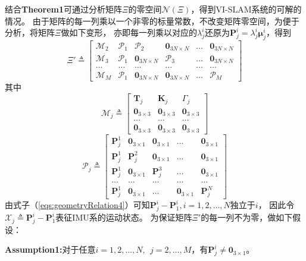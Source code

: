 \documentclass{article}
\begin{document}
\par
结合\textbf{Theorem1}可通过分析矩阵$\Xi$的零空间$\mathcal{N}(\Xi)$，得到VI-SLAM系统的可解的情况。
由于矩阵的每一列乘以一个非零的标量常数，不改变矩阵零空间，为便于分析，将矩阵$\Xi$做如下变形，
亦即每一列乘以对应的$\lambda_j^i$还原为$\textbf{P}_j^i=\lambda_j^i\mathbf{\mu}_j^i$，得到
\begin{equation}
    \Xi'\triangleq \left[\begin{array}{cccccc}
        \mathcal{M}_2&\mathcal{P}_1&\mathcal{P}_2&\textbf{0}_{3N\times N}&\dots&\textbf{0}_{3N\times N}\\
        \mathcal{M}_3&\mathcal{P}_1&\textbf{0}_{3N\times N}&\mathcal{P}_3&\dots&\textbf{0}_{3N\times N}\\
        \dots&\dots&\dots&\dots&\dots&\dots\\
        \mathcal{M}_M&\mathcal{P}_1&\textbf{0}_{3N\times N}&\textbf{0}_{3N\times N}&\dots&\mathcal{P}_M
    \end{array}\right]
\end{equation}
其中
\begin{equation}
    \mathcal{M}_j\triangleq \left[\begin{array}{ccc}
        \textbf{T}_j&\textbf{K}_j&\Gamma_j\\
        \textbf{0}_{3\times 3}&\textbf{0}_{3\times 3}&\textbf{0}_{3\times 3}\\
        \dots&\dots&\dots\\
        \textbf{0}_{3\times 3}&\textbf{0}_{3\times 3}&\textbf{0}_{3\times 3}
    \end{array}\right]
\end{equation}
\begin{equation}
    \mathcal{P}_j\triangleq \left[\begin{array}{ccccc}
        \textbf{P}_j^1&\textbf{0}_{3\times 1}&\textbf{0}_{3\times 1}&\dots&\textbf{0}_{3\times 1}\\
        \textbf{P}_j^1&\textbf{P}_j^2&\textbf{0}_{3\times 1}&\dots&\textbf{0}_{3\times 1}\\
        \textbf{P}_j^1&\textbf{0}_{3\times 1}&\textbf{P}_j^3&\dots&\textbf{0}_{3\times 1}\\
        \dots&\dots&\dots&\dots&\dots\\
        \textbf{P}_j^1&\textbf{0}_{3\times 1}&\dots&\textbf{0}_{3\times 1}&\textbf{P}_j^N
    \end{array}\right]
\end{equation}
由式子（\ref{eqs:geometryRelation4}）可知$\textbf{P}_j^i-\textbf{P}_1^i,i=1,2,\dots,N$独立于$i$，
因此令$\mathcal{X}_j\triangleq \textbf{P}_j^i-\textbf{P}_1^i$表征IMU系的运动状态。
为保证矩阵$\Xi'$的每一列不为零，做如下假设：
\par
\textbf{Assumption1:}对于任意$i=1,2,\dots,N,\ \ j=2,\dots,M$，有$\textbf{P}_j^i\not=\textbf{0}_{3\times 1}$。
\end{document}
